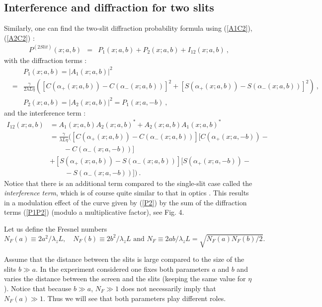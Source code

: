 \documentclass[12pt]{article}   %
\begin{document}
\subsection{Interference and diffraction for two slits}
Similarly, one can find the two-slit diffraction probability
formula using (\ref{A1C2}), (\ref{A2C2}) :
\begin{eqnarray}\label{P2}
P^{(2 Slit)}(x;a,b) &=& P_1(x;a,b)+P_2(x;a,b)+I_{12}(x;a,b)\ ,
\end{eqnarray}
with the diffraction terms :
\begin{eqnarray}\label{P1P2}
&&P_1(x;a,b)= |A_1(x;a,b)|^2
{}\nonumber\\{}&=&\frac{\gamma}{2\lambda
L\eta}\left([C(\alpha_{+}(x;a,b))-C(\alpha_{-}(x;a,b))]^2+[S(\alpha_{+}(x;a,b))-S(\alpha_{-}(x;a,b))]^2\right)\
, {}\nonumber\\{}&& P_2(x;a,b) = |A_2(x;a,b)|^2 = P_1(x;a,-b)\ ,
\end{eqnarray}
and the interference term :
\begin{align}\label{I12}
I_{12}(x;a,b)&=A_1(x;a,b)A_2(x;a,b)^* + A_2(x;a,b) A_1(x;a,b)^*
{}\nonumber\\{}&=\frac{\gamma}{\lambda L\eta}
([C(\alpha_{+}(x;a,b))- C(\alpha_{-}(x;a,b))][C(\alpha_{+}(x;a,-b))- \nonumber\\ & \quad\quad - C(\alpha_{-}(x;a,-b))]
{}\nonumber\\{}&+[S(\alpha_{+}(x;a,b))-S(\alpha_{-}(x;a,b))][S(\alpha_{+}(x;a,-b))- \nonumber\\ & \quad\quad\, - S(\alpha_{-}(x;a,-b))])\ .
\end{align}
Notice that there is an additional term compared to the
single-slit case called the \textit{interference term}, which is
of course quite similar to that in optics \cite{Optics}. This
results in a modulation effect of the curve given by (\ref{P2}) by
the sum of the diffraction terms (\ref{P1P2}) (modulo a
multiplicative factor), see Fig. 4.

Let us define the Fresnel numbers
$$ N_F(a)\equiv2a^2/\lambda_z L, \quad
N_F(b)\equiv2b^2/\lambda_z L \mbox{ and } N_F\equiv2ab/\lambda_z L =
\sqrt{N_F(a)N_F(b)/2}.  $$


Assume that the distance between the slits is large compared to
the size of the slits $b\gg a$. In the experiment considered one
fixes both parameters $a$ and $b$ and varies the distance between
the screen and the slits (keeping the same value for $\eta$).
Notice that because $b\gg a$, $N_F\gg 1$ does not necessarily
imply that $N_F(a)\gg1$. Thus we will see that both parameters
play different roles.
\end{document}
